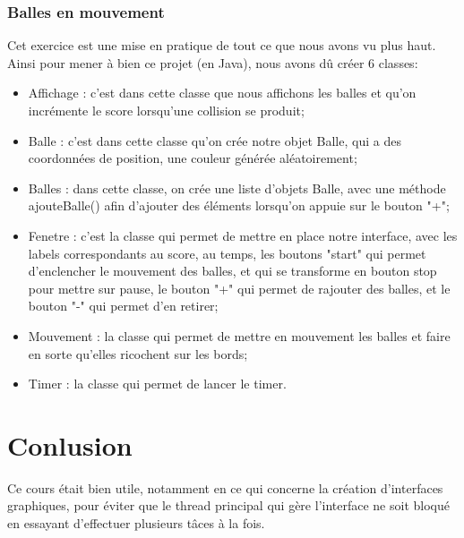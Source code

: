 \documentclass{article}
\begin{document}
\subsubsection{Balles en mouvement}
\label{section : balles}

Cet exercice est une mise en pratique de tout ce que nous avons vu plus haut. Ainsi pour mener à bien ce projet (en Java), nous avons dû créer 6 classes:
\begin{itemize}
\item Affichage : c'est dans cette classe que nous affichons les balles et qu'on incrémente le score lorsqu'une collision se produit;
\item Balle : c'est dans cette classe qu'on crée notre objet Balle, qui a des coordonnées de position, une couleur générée aléatoirement;
\item Balles : dans cette classe, on crée une liste d'objets Balle, avec une méthode ajouteBalle() afin d'ajouter des éléments lorsqu'on appuie sur le bouton "+";
\item Fenetre : c'est la classe qui permet de mettre en place notre interface, avec les labels correspondants au score, au temps, les boutons "start" qui permet d'enclencher le mouvement des balles, et qui se transforme en bouton stop pour mettre sur pause, le bouton "+" qui permet de rajouter des balles, et le bouton "-" qui permet d'en retirer;
\item Mouvement : la classe qui permet de mettre en mouvement les balles et faire en sorte qu'elles ricochent sur les bords;
\item Timer : la classe qui permet de lancer le timer.
\end{itemize}




\section{Conlusion}

Ce cours était bien utile, notamment en ce qui concerne la création d'interfaces graphiques, pour éviter que le thread principal qui gère l'interface ne soit bloqué en essayant d'effectuer plusieurs tâces à la fois.




\end{document}
